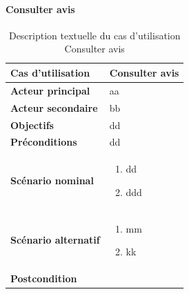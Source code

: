         \paragraph[Consulter avis]{Consulter avis}
            \begin{longtable}{p{4cm} p{9cm}}
                \caption{Description textuelle du cas d’utilisation Consulter avis}
                \label{table:usecaseConsulterAvis}
                \\\hline\hline
                    \textbf{Cas d’utilisation} & \textbf{Consulter avis}
                \\\hline\hline
                        \textbf{Acteur principal} & aa
                    \\
                        \textbf{Acteur secondaire} & bb
                    \\
                        \textbf{Objectifs} & dd
                    \\
                        \textbf{Préconditions} & dd
                    \\
                    \textbf{Scénario nominal} &
                        \begin{enumerate}[leftmargin=*]
                            \item dd
                            \item ddd
                        \end{enumerate}
                    \\
                    \textbf{Scénario alternatif} &
                        \begin{enumerate}[leftmargin=*]
                            \item mm
                            \item kk
                        \end{enumerate}
                    \\
                    \textbf{Postcondition}
                \\\bottomrule
            \end{longtable}

